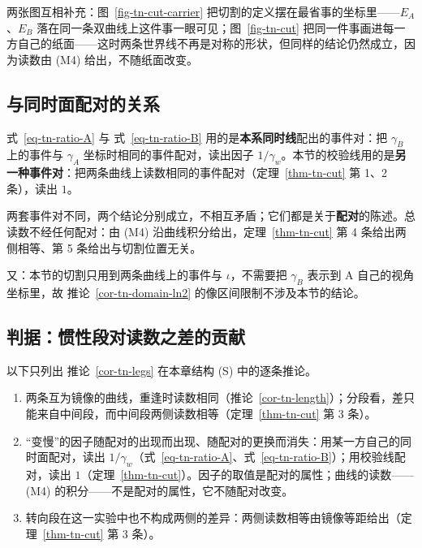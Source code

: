 \documentclass[
  chinese,
  a4paper,
  UTF8,
  12pt,
  oneside,
  openany]{ctexbook}
\providecommand{\tightlist}{%
  \setlength{\itemsep}{0pt}\setlength{\parskip}{0pt}}
\theoremstyle{plain}
\theoremstyle{plain}
\theoremstyle{plain}
\theoremstyle{definition}
\theoremstyle{plain}
\theoremstyle{plain}
\theoremstyle{remark}
\begin{document}
两张图互相补充：图~\ref{fig-tn-cut-carrier}
把切割的定义摆在最省事的坐标里------\(E_A\)、\(E_B\)
落在同一条双曲线上这件事一眼可见；图~\ref{fig-tn-cut}
把同一件事画进每一方自己的纸面------这时两条世界线不再是对称的形状，但同样的结论仍然成立，因为读数由
(M4) 给出，不随纸面改变。

\subsection{与同时面配对的关系}\label{ux4e0eux540cux65f6ux9762ux914dux5bf9ux7684ux5173ux7cfb}

式~\ref{eq-tn-ratio-A} 与 式~\ref{eq-tn-ratio-B}
用的是\textbf{本系同时线}配出的事件对：把 \(\gamma_B\) 上的事件与
\(\gamma_A\) 坐标时相同的事件配对，读出因子
\(1/\gamma_w\)。本节的校验线用的是\textbf{另一种事件对}：把两条曲线上读数相同的事件配对（定理~\ref{thm-tn-cut}
第 1、2 条），读出 \(1\)。

两套事件对不同，两个结论分别成立，不相互矛盾；它们都是关于\textbf{配对}的陈述。总读数不经任何配对：由
(M4) 沿曲线积分给出，定理~\ref{thm-tn-cut} 第 4 条给出两侧相等、第 5
条给出与切割位置无关。

又：本节的切割只用到两条曲线上的事件与 \(\iota\)，不需要把 \(\gamma_B\)
表示到 A 自己的视角坐标里，故 推论~\ref{cor-tn-domain-ln2}
的像区间限制不涉及本节的结论。

\subsection{判据：惯性段对读数之差的贡献}\label{ux5224ux636eux60efux6027ux6bb5ux5bf9ux8bfbux6570ux4e4bux5deeux7684ux8d21ux732e}

以下只列出 推论~\ref{cor-tn-legs} 在本章结构 (S) 中的逐条推论。

\begin{enumerate}
\def\labelenumi{\arabic{enumi}.}
\tightlist
\item
  两条互为镜像的曲线，重逢时读数相同（推论~\ref{cor-tn-length}）；分段看，差只能来自中间段，而中间段两侧读数相等（定理~\ref{thm-tn-cut}
  第 3 条）。
\item
  ``变慢''的因子随配对的出现而出现、随配对的更换而消失：用某一方自己的同时面配对，读出
  \(1/\gamma_w\)（式~\ref{eq-tn-ratio-A}、式~\ref{eq-tn-ratio-B}）；用校验线配对，读出
  \(1\)（定理~\ref{thm-tn-cut}）。因子的取值是配对的属性；曲线的读数------(M4)
  的积分------不是配对的属性，它不随配对改变。
\item
  转向段在这一实验中也不构成两侧的差异：两侧读数相等由镜像等距给出（定理~\ref{thm-tn-cut}
  第 3 条）。
\end{enumerate}
\end{document}
